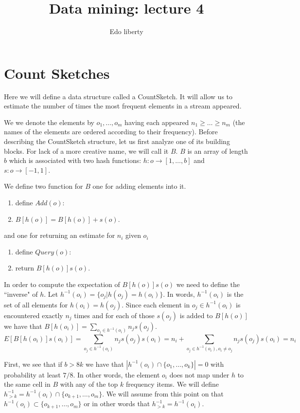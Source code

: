 \documentclass{article}
\title{Data mining: lecture 4} %
\author{Edo liberty}
\date{\nonumber}
\newcommand{\tab}{\hspace{.5cm}}
\begin{document}
\maketitle
\section*{Count Sketches}

Here we will define a data structure called a CountSketch. 
It will allow us to estimate the number of times the most frequent elements in a stream appeared.

We we denote the elements by $o_1,\ldots,o_m$ having each appeared $n_1 \ge \ldots \ge n_m$
(the names of the elements are ordered according to their frequency).
Before describing the CountSketch structure, let us first analyze one of its building blocks.
For lack of a more creative name, we will call it $B$.
$B$ is an array of length $b$ which is associated with two hash functions:
$h: o \rightarrow [1,\ldots,b]$ and $s: o \rightarrow [-1,1]$.
  
We define two function for $B$ one for adding elements into it.
\begin{enumerate}
\item define $Add(o)$:
\item \tab $B[h(o)] = B[h(o)] + s(o)$. 
\end{enumerate} 
and one for returning an estimate for $n_i$ given $o_i$
\begin{enumerate}
\item define $Query(o)$:
\item \tab return $B[h(o)]s(o)$. 
\end{enumerate} 

In order to compute the expectation of $B[h(o)]s(o)$ we need to define the ``inverse" of $h$. 
Let $h^{-1}(o_i) = \{o_j | h(o_j) = h(o_i)\}$. In words, $h^{-1}(o_i)$ is the set of all elements for $h(o_i)=h(o_j)$.
Since each element in $o_j \in h^{-1}(o_i)$ is encountered exactly $n_j$ times and for each of those $s(o_j)$ is added to $B[h(o)]$
we have that $B[h(o_i)] = \sum_{o_j \in h^{-1}(o_i)} n_j s(o_j)$.
$$
E[B[h(o_i)]s(o_i)] = \sum_{o_j \in h^{-1}(o_i)} n_j s(o_j)s(o_i) = n_i + \sum_{o_j \in h^{-1}(o_i),o_i \ne o_j} n_j s(o_j)s(o_i) = n_i
$$

First, we see that if $b > 8k$ we have that $|h^{-1}(o_i)\cap\{o_1,\ldots,o_k\} |=0$ with probability at least $7/8$.
In other words, the element $o_i$ does not map under $h$ to the same cell in $B$ with any of the top $k$ frequency items.
We will define $h^{-1}_{>k} = h^{-1}(o_i)\cap\{o_{k+1},\ldots,o_m\}$.
We will assume from this point on that $h^{-1}(o_i) \subset \{o_{k+1},\ldots,o_m\}$ or in other words that $h^{-1}_{>k} = h^{-1}(o_i)$.
\end{document}
